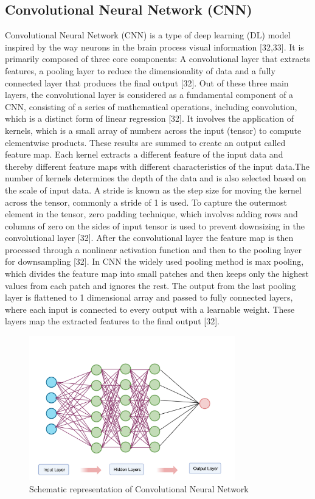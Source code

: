 \documentclass[12pt,a4paper]{report}
\begin{document}
\subsection{Convolutional Neural Network (CNN)}

Convolutional Neural Network (CNN) is a type of deep learning (DL) model inspired by the way neurons in the brain process visual information [32,33]. It is primarily composed of three core components: A convolutional layer that extracts features, a pooling layer to reduce the 
dimensionality of data and a fully connected layer that produces the final output [32]. Out of these three main layers, the convolutional layer is considered as a fundamental component of a CNN, consisting of a series of mathematical operations, including convolution, which is 
a distinct form of linear regression [32]. It involves the application of kernels, which is a small array of numbers across the input (tensor) to compute elementwise products. These results are summed to create an output called feature map. Each kernel extracts a different feature 
of the input data and thereby different feature maps with different characteristics of the input data.The number of kernels determines the depth of the data and is also selected based on the scale of input data. A stride is known as the step size for moving the kernel across the tensor, 
commonly a stride of 1 is used. To capture the outermost element in the tensor, zero padding technique, which involves adding rows and columns of zero on the sides of input tensor is used to prevent downsizing in the convolutional layer [32]. After the convolutional layer the feature map 
is then processed through a nonlinear activation function and then to the pooling layer for downsampling [32]. In CNN the widely used pooling method is max pooling, which divides the feature map into small patches and then keeps only the highest values from each patch and ignores the rest. 
The output from the last pooling layer is flattened to 1 dimensional array and passed to fully connected layers, where each input is connected to every output with a learnable weight. These layers map the extracted features to the final output [32]. \\

\begin{figure}[h]
    \centering
    \includegraphics[width=0.8\textwidth]{Figures/cnn.png}
    \caption{Schematic representation of Convolutional Neural Network }
    \label{fig:cnn}
\end{figure}
\end{document}
